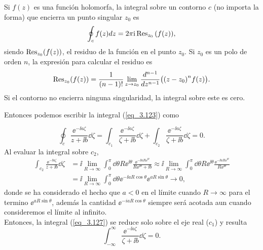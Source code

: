\begin{itemize}
    \begin{theorem} 
        Si $f(z)$ es una función holomorfa, la integral sobre un contorno $c$ (no importa la forma) que encierra un punto singular $z_0$ es
            \begin{equation}
                \oint_{c} f(z) dz = 2\pi \ii \Res_{z_0} \qty(f(z)), 
            \end{equation} 
        siendo $\Res_{z_0}(f(z))$, el residuo de la función en el punto $z_0$. Si $z_0$ es un polo de orden $n$, la expresión para calcular el residuo es 
            \begin{equation}
                \Res_{z_0}(f(z))=\frac{1}{(n-1)!} \lim_{z\to z_0} \frac{d^{n-1}}{dz^{n-1}}\qty\big(\qty(z-z_0)^n f(z)).
            \end{equation}
        Si el contorno no encierra ninguna singularidad, la integral sobre este es cero.
    \end{theorem}

    Entonces podemos escribir la integral (\ref{eq_3.123}) como

    \begin{equation}
        \oint_{c} \frac{\ee^{-\ii a \zeta}}{z+\ii b} \dd{\zeta} = \int_{c_1} \frac{\ee^{-\ii a \zeta}}{\zeta+\ii b} \dd{\zeta} + \int_{c_2} \frac{\ee^{-\ii a \zeta}}{\zeta+\ii b} \dd{\zeta} = 0.
        \label{eq_3.127}
    \end{equation}
    Al evaluar la integral sobre $c_2$,
    \begin{equation*}
        \begin{split}
            \int_{c_2}  \frac{\ee^{-\ii a \zeta}}{z+\ii b} \dd{\zeta} &= \ii \lim_{R \to \infty} \int_0^\pi \dd{\theta} R\ee^{\ii \theta} \frac{\ee^{-\ii a R \ee^{\ii \theta}}}{R \ee^{\ii \theta}+\ii b} \approx \ii \lim_{R \to \infty} \int_0^\pi \dd{\theta} R\ee^{\ii \theta} \frac{\ee^{-\ii a R \ee^{\ii \theta}}}{R \ee^{\ii \theta}} \\
            &= \ii \lim_{R \to \infty} \int_0^\pi \dd{\theta} \ee^{-\ii a R \cos \theta }\ee^{a R \sin \theta } \to 0, 
        \end{split}
    \end{equation*}
    donde se ha considerado el hecho que $a<0$ en el límite cuando $R\to \infty$ para el termino $\ee^{a R \sin \theta }$, además la cantidad $\ee^{-ia R \cos \theta }$ siempre será acotada aun cuando consideremos el límite al infinito.\\

    Entonces, la integral (\ref{eq_3.127}) se reduce solo sobre el eje real ($c_1$) y resulta
    \begin{equation}
        \int_{-\infty}^\infty \frac{\ee^{-\ii a \zeta}}{\zeta+\ii b} \dd{\zeta} = 0.
        \label{eq_3.128}
    \end{equation} 
    

\end{itemize}
